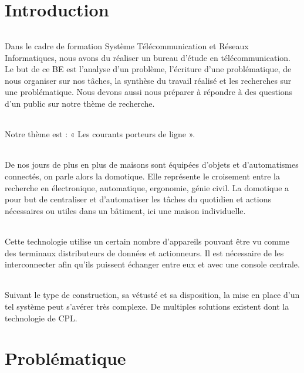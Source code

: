 
\part*{Introduction}
    \paragraph{}
Dans le cadre de formation Système Télécommunication et Réseaux Informatiques, nous avons du réaliser un bureau d'étude en télécommunication.
Le but de ce BE est l'analyse d'un problème, l'écriture d'une problématique, de nous organiser sur nos tâches, la synthèse du travail réalisé et les recherches sur une problématique.
Nous devons aussi nous préparer à répondre à des questions d'un public sur notre thème de recherche.
    \paragraph{}
Notre thème est : « Les courants porteurs de ligne ».
    \paragraph{}
De nos jours de plus en plus de maisons sont équipées d'objets et d'automatismes connectés, on parle alors la domotique.
Elle représente le croisement entre la recherche en électronique, automatique, ergonomie, génie civil.
La domotique a pour but de centraliser et d'automatiser les tâches du quotidien et actions nécessaires ou utiles dans un bâtiment, ici une maison individuelle.
    \paragraph{}
Cette technologie utilise un certain nombre d'appareils pouvant être vu comme des terminaux distributeurs de données et actionneurs.
Il est nécessaire de les interconnecter afin qu'ils puissent échanger entre eux et avec une console centrale.
    \paragraph{}
Suivant le type de construction, sa vétusté et sa disposition, la mise en place d'un tel système peut s'avérer très complexe.
De multiples solutions existent dont la technologie de CPL.

    \clearpage


\part*{Problématique}
